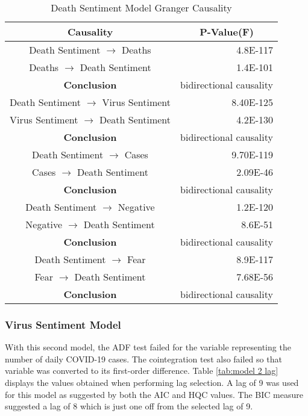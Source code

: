 \begin{table}[H]
\centering
\begin{tabular}{@{}cr@{}}
\toprule
\textbf{Causality} & \multicolumn{1}{c}{\textbf{P-Value(F)}} \\ \midrule
Death Sentiment $\rightarrow$ Deaths & 4.8E-117 \\
Deaths $\rightarrow$ Death Sentiment & 1.4E-101 \\
\textbf{Conclusion} & \multicolumn{1}{c}{bidirectional causality} \\
Death Sentiment $\rightarrow$ Virus Sentiment & 8.40E-125 \\
Virus Sentiment $\rightarrow$ Death Sentiment & 4.2E-130 \\
\textbf{Conclusion} & \multicolumn{1}{c}{bidirectional causality} \\
Death Sentiment $\rightarrow$ Cases & 9.70E-119 \\
Cases $\rightarrow$ Death Sentiment & 2.09E-46 \\
\textbf{Conclusion} & \multicolumn{1}{c}{bidirectional causality} \\
Death Sentiment $\rightarrow$ Negative & 1.2E-120 \\
Negative $\rightarrow$ Death Sentiment & 8.6E-51 \\
\textbf{Conclusion} & \multicolumn{1}{c}{bidirectional causality} \\
Death Sentiment $\rightarrow$ Fear & 8.9E-117 \\
Fear $\rightarrow$ Death Sentiment & 7.68E-56 \\
\textbf{Conclusion} & \multicolumn{1}{c}{bidirectional causality} \\ \bottomrule
\end{tabular}
\caption{Death Sentiment Model Granger Causality}
\label{tab:model 1 causality}
\end{table}

\subsubsection{Virus Sentiment Model}

With this second model, the ADF test failed for the variable representing the number of daily COVID-19 cases. The cointegration test also failed so that variable was converted to its first-order difference. Table \ref{tab:model 2 lag} displays the values obtained when performing lag selection. A lag of 9 was used for this model as suggested by both the AIC and HQC values. The BIC measure suggested a lag of 8 which is just one off from the selected lag of 9.

